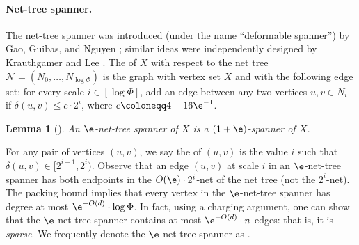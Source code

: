 \documentclass[11pt]{article}
\newtheorem{lemma}[theorem]{Lemma}
\newcommand{\dist}{\ensuremath{\delta}}
\newcommand{\ddim}{\ensuremath{d}}
\begin{document}
\paragraph{Net-tree spanner.}
The net-tree spanner was introduced (under the name ``deformable spanner'') by Gao, Guibas, and Nguyen \cite{gao2004deformable}; similar ideas were independently designed by Krauthgamer and Lee \cite{KL04}.  The  of $X$ with respect to the net tree $\mathcal{N} = (N_0, \ldots, N_{\log \Phi})$ is the graph with vertex set $X$ and with the following edge set: for every scale $i \in [\log \Phi]$, add an edge between any two vertices $u, v \in N_i$ if $\dist(u, v) \le c \cdot 2^i$, where $c \coloneqq 4 + 16 \e^{-1}$.
\begin{lemma}[{\cite[Theorem 3.2]{gao2004deformable}}]
\label{lem:net-spanner}
    An $\e$-net-tree spanner of $X$ is a $(1+\e)$-spanner of $X$.
\end{lemma}
For any pair of vertices $(u, v)$, we say the  of $(u, v)$ is the value $i$ such that $\dist(u, v) \in [2^{i-1}, 2^i)$. Observe that an edge $(u,v)$ at scale $i$ in an $\e$-net-tree spanner has both endpoints in the $O(\e) \cdot 2^i$-net of the net tree
(not the $2^i$-net). The packing bound implies that every vertex in the $\e$-net-tree spanner has degree at most $\e^{-O(\ddim)} \cdot \log \Phi$.
In fact, using a charging argument,
one can show that the $\e$-net-tree spanner contains at most $\e^{-O(\ddim)} \cdot n$ edges: that is, it is \emph{sparse}.
We frequently denote the $\e$-net-tree spanner as .
\end{document}
